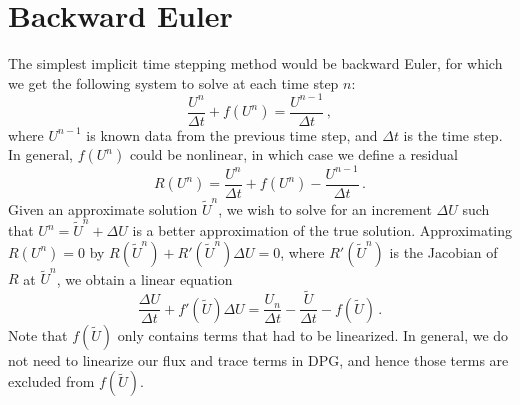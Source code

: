 \documentclass[Proposal.tex]{subfiles}
\begin{document}
\section{Backward Euler}
The simplest implicit time stepping method would be backward Euler, for which we get the following system to solve at each time step $n$:
\begin{equation}
	\frac{U^{n}}{\Delta t}+f(U^{n})=\frac{U^{n-1}}{\Delta t}\,,
\end{equation}
where $U^{n-1}$ is known data from the previous time step, and $\Delta t$ is the time step. 
In general, $f(U^n)$ could be nonlinear, in which case we define a residual
\begin{equation}
	R(U^n)=\frac{U^n}{\Delta t}+f(U^n)-\frac{U^{n-1}}{\Delta t}\,.
\end{equation}
Given an approximate solution $\tilde U^n$, we wish to solve for an increment $\Delta U$ such that $U^n=\tilde U^n+\Delta U$ is a better approximation of the true solution.
Approximating $R(U^n)=0$ by $R(\tilde U^n)+R'(\tilde U^n)\Delta U=0$, where $R'(\tilde U^n)$ is the Jacobian of $R$ at $\tilde U^n$, we obtain a linear equation
\begin{equation}
\frac{\Delta U}{\Delta t}+f'(\tilde U)\Delta U
=\frac{U_n}{\Delta t}-\frac{\tilde U}{\Delta t}
-f(\tilde U)\,.
\end{equation}
Note that $f(\tilde U)$ only contains terms that had to be linearized. In general, we do not need to linearize our flux and trace terms in DPG, and hence those terms are excluded from $f(\tilde U)$.

%                                                            
%                                                            
%                        
\end{document}
